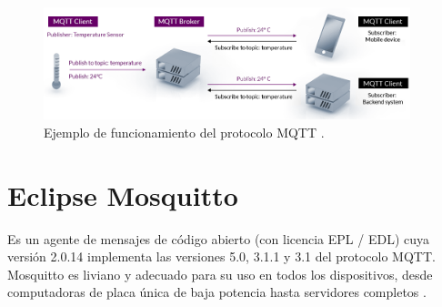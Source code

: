 \begin{itemize}
\vspace{2.0cm}

\begin{figure}[htbp]
	\centering
	\includegraphics[width=0.95\textwidth]{./Figures/mqtt.png}
	\caption{Ejemplo de funcionamiento del protocolo MQTT \protect\footnotemark.}
	\label{fig:mqtt}
\end{figure}


\end{itemize}





\section{Eclipse Mosquitto} 
Es un agente de mensajes de código abierto (con licencia EPL / EDL) cuya versión 2.0.14 implementa las versiones 5.0, 3.1.1 y 3.1 del protocolo MQTT. Mosquitto es liviano y adecuado para su uso en todos los dispositivos, desde computadoras de placa única de baja potencia hasta servidores completos \citep{WEBSITE:5}.

